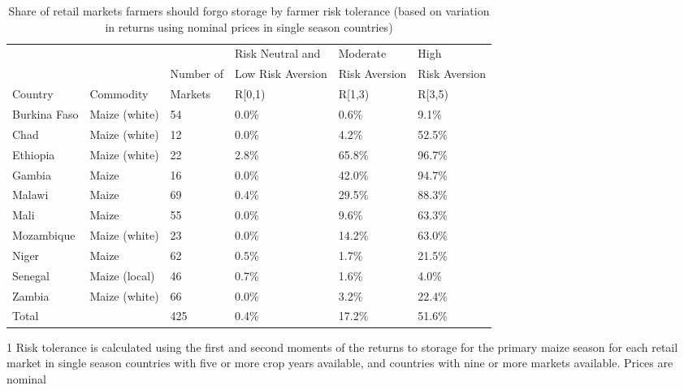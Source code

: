 \begin{table}[ht]
	\begin{threeparttable}[t]
		\centering
		\caption{Share of retail markets farmers should forgo storage by farmer risk tolerance (based on variation in returns using nominal prices in single season countries)}
		\label{tab:risk_return}
		\begin{tabular}{|lll|lll|}
			\hline 
			&   & & Risk Neutral and & Moderate & High \\ 
			& & Number of  & Low Risk Aversion & Risk Aversion &  Risk Aversion\\ 
			Country& Commodity & Markets& R\in[0,1) &  R\in[1,3) & R\in[3,5) \\ 
			\hline
Burkina Faso & Maize (white) & 54 & 0.0\% & 0.6\% & 9.1\% \\ 
  Chad & Maize (white) & 12 & 0.0\% & 4.2\% & 52.5\% \\ 
  Ethiopia & Maize (white) & 22 & 2.8\% & 65.8\% & 96.7\% \\ 
  Gambia & Maize & 16 & 0.0\% & 42.0\% & 94.7\% \\ 
  Malawi & Maize & 69 & 0.4\% & 29.5\% & 88.3\% \\ 
  Mali & Maize & 55 & 0.0\% & 9.6\% & 63.3\% \\ 
  Mozambique & Maize (white) & 23 & 0.0\% & 14.2\% & 63.0\% \\ 
  Niger & Maize & 62 & 0.5\% & 1.7\% & 21.5\% \\ 
  Senegal & Maize (local) & 46 & 0.7\% & 1.6\% & 4.0\% \\ 
  Zambia & Maize (white) & 66 & 0.0\% & 3.2\% & 22.4\% \\ 
  \hline
  Total &  & 425 & 0.4\% & 17.2\% & 51.6\% \\ 
  \hline
\end{tabular}
\begin{tablenotes}
\item [1] \footnotesize Risk tolerance is calculated using the first and second moments of the returns to storage for the primary maize season for each retail market in single season countries with five or more crop years available, and countries with nine or more markets available. Prices are nominal
\end{tablenotes}
\end{threeparttable}
\end{table}

